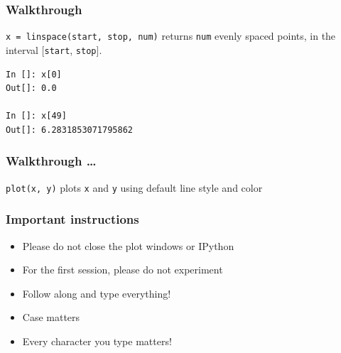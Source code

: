 \documentclass[14pt,compress]{beamer}
\newcounter{time}
\newcommand{\inctime}[1]{\addtocounter{time}{#1}{\tiny \thetime\ m}}
\newcommand{\typ}[1]{\lstinline{#1}}
\begin{document}
\begin{frame}[fragile]
\frametitle{Walkthrough}
\begin{block}{\typ{x = linspace(start, stop, num)} }
returns \typ{num} evenly spaced points, in the interval [\typ{start}, \typ{stop}].
\end{block}
\vspace*{.35in}
\begin{block}{}
  \small
\begin{lstlisting}
In []: x[0]
Out[]: 0.0

In []: x[49]
Out[]: 6.2831853071795862
\end{lstlisting}
\end{block}
\end{frame}

\begin{frame}[fragile]
\frametitle{Walkthrough \ldots}
\begin{block}{\typ{plot(x, y)}}
plots \typ{x} and \typ{y} using default line style and color
\end{block}
\inctime{5}
\end{frame}

\begin{frame}
  \frametitle{Important instructions}
  \begin{itemize}
  \item Please do not close the plot windows or IPython
  \item For the first session, please do not experiment
  \item Follow along and type everything!
  \item Case matters
  \item Every character you type matters!
  \end{itemize}
\end{frame}
\end{document}
